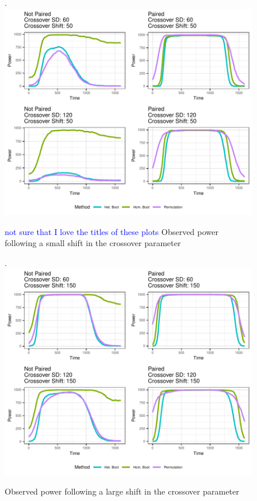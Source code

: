 \documentclass{article}
\providecommand{\cn}[1]{\textcolor{blue}{#1}}
\begin{document}
\begin{figure}[t]
\centering.
\includegraphics{log_shift_1.pdf}
\caption{\cn{not sure that I love the titles of these plots} Observed power following a small shift in the crossover parameter}
\label{fig:log_shift_1}
\end{figure}

\begin{figure}[t]
\centering.
\includegraphics{log_shift_2.pdf}
\caption{Observed power following a large shift in the crossover parameter}
\label{fig:log_shift_2}
\end{figure}
\end{document}
